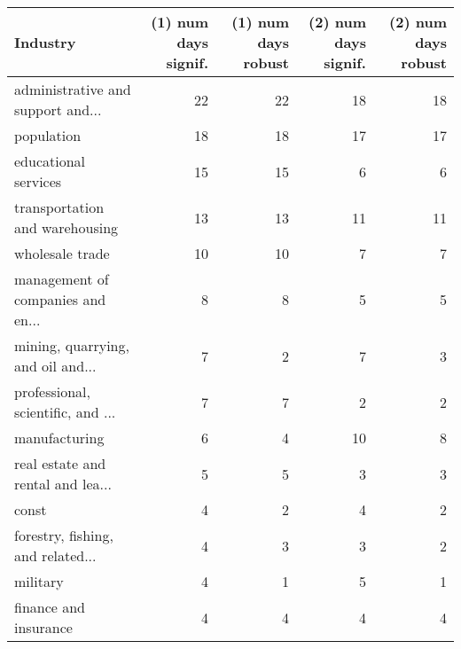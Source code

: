 \begin{tabular}{lrrrr}
\hline
 Industry                          &   (1) num days signif. &   (1) num days robust &   (2) num days signif. &   (2) num days robust \\
\hline
 administrative and support and... &                     22 &                    22 &                     18 &                    18 \\
 population                        &                     18 &                    18 &                     17 &                    17 \\
 educational services              &                     15 &                    15 &                      6 &                     6 \\
 transportation and warehousing    &                     13 &                    13 &                     11 &                    11 \\
 wholesale trade                   &                     10 &                    10 &                      7 &                     7 \\
 management of companies and en... &                      8 &                     8 &                      5 &                     5 \\
 mining, quarrying, and oil and... &                      7 &                     2 &                      7 &                     3 \\
 professional, scientific, and ... &                      7 &                     7 &                      2 &                     2 \\
 manufacturing                     &                      6 &                     4 &                     10 &                     8 \\
 real estate and rental and lea... &                      5 &                     5 &                      3 &                     3 \\
 const                             &                      4 &                     2 &                      4 &                     2 \\
 forestry, fishing, and related... &                      4 &                     3 &                      3 &                     2 \\
 military                          &                      4 &                     1 &                      5 &                     1 \\
 finance and insurance             &                      4 &                     4 &                      4 &                     4 \\

\end{tabular}
